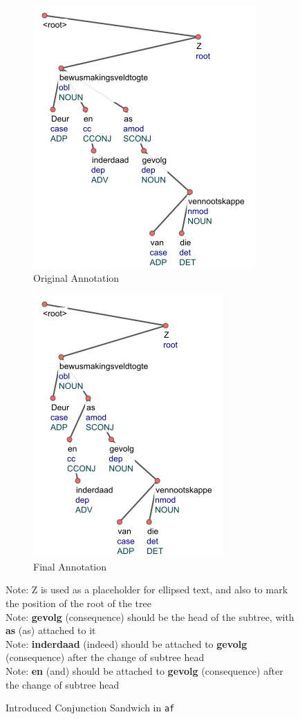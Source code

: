 \begin{figure}[H]
    \begin{subfigure}{.48\textwidth}
    \centering
    \includegraphics[scale=0.8]{img/siblingAttach-af-1.png}
    \caption{Original Annotation}
    \label{fig:siblingAttach-af-1}
    \end{subfigure}
    \begin{subfigure}{.5\textwidth}
    \centering
    \includegraphics[scale=0.8]{img/siblingAttach-af-2.png}
    \caption{Final Annotation}
    \label{fig:siblingAttach-af-2}
    \end{subfigure}
    \caption{Introduced Conjunction Sandwich in \texttt{af}}
    \label{fig:siblingAttach-af}
    Note: Z is used as a placeholder for ellipsed text, and also to mark the position of the root of the tree\\
    Note: \textbf{gevolg} (consequence) should be the head of the subtree, with \textbf{as} (as) attached to it\\
    Note: \textbf{inderdaad} (indeed) should be attached to \textbf{gevolg} (consequence) after the change of subtree head\\
    Note: \textbf{en} (and) should be attached to \textbf{gevolg} (consequence) after the change of subtree head
\end{figure}

